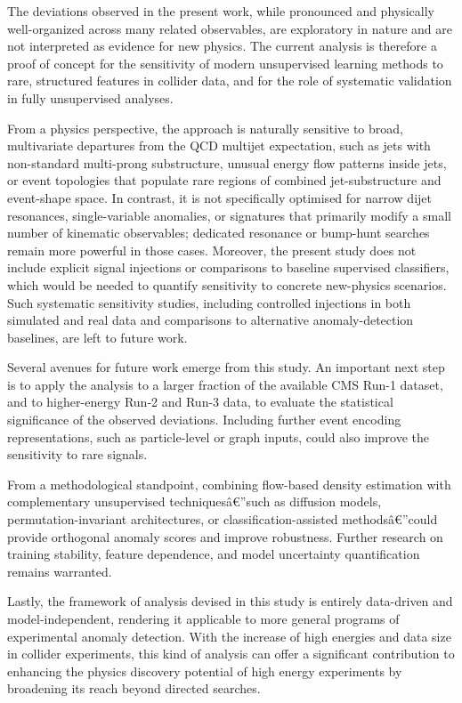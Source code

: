 \documentclass[11pt]{article}
\begin{document}
The deviations observed in the present work, while pronounced and physically well-organized across many related observables, are exploratory in nature and are not interpreted as evidence for new physics. The current analysis is therefore a proof of concept for the sensitivity of modern unsupervised learning methods to rare, structured features in collider data, and for the role of systematic validation in fully unsupervised analyses.

From a physics perspective, the approach is naturally sensitive to broad, multivariate departures from the QCD multijet expectation, such as jets with non-standard multi-prong substructure, unusual energy flow patterns inside jets, or event topologies that populate rare regions of combined jet-substructure and event-shape space. In contrast, it is not specifically optimised for narrow dijet resonances, single-variable anomalies, or signatures that primarily modify a small number of kinematic observables; dedicated resonance or bump-hunt searches remain more powerful in those cases. Moreover, the present study does not include explicit signal injections or comparisons to baseline supervised classifiers, which would be needed to quantify sensitivity to concrete new-physics scenarios. Such systematic sensitivity studies, including controlled injections in both simulated and real data and comparisons to alternative anomaly-detection baselines, are left to future work.

Several avenues for future work emerge from this study. An important next step is to apply the analysis to a larger fraction of the available CMS Run-1 dataset, and to higher-energy Run-2 and Run-3 data, to evaluate the statistical significance of the observed deviations. Including further event encoding representations, such as particle-level or graph inputs, could also improve the sensitivity to rare signals.

From a methodological standpoint, combining flow-based density estimation with complementary unsupervised techniquesâ€”such as diffusion models, permutation-invariant architectures, or classification-assisted methodsâ€”could provide orthogonal anomaly scores and improve robustness. Further research on training stability, feature dependence, and model uncertainty quantification remains warranted.

Lastly, the framework of analysis devised in this study is entirely data-driven and model-independent, rendering it applicable to more general programs of experimental anomaly detection. With the increase of high energies and data size in collider experiments, this kind of analysis can offer a significant contribution to enhancing the physics discovery potential of high energy experiments by broadening its reach beyond directed searches.
\end{document}
